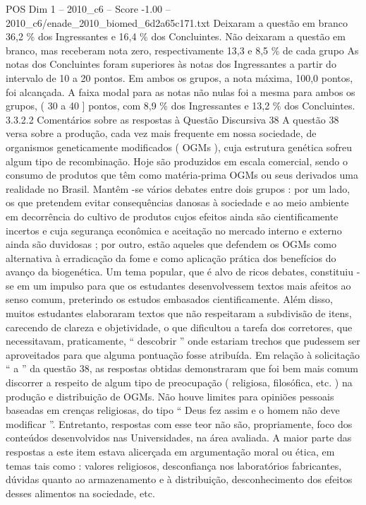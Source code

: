 \begin{textsample}{POS Dim 1 – 2010\_c6 – Score -1.00 – 2010\_c6/enade\_2010\_biomed\_6d2a65c171.txt}
Deixaram a questão em branco 36,2 \% dos Ingressantes e 16,4 \% dos Concluintes.
Não deixaram a questão em branco, mas receberam nota zero, respectivamente 13,3 e 8,5 \% de cada grupo As notas dos Concluintes foram superiores às notas dos Ingressantes a partir do intervalo de 10 a 20 pontos.
Em ambos os grupos, a nota máxima, 100,0 pontos, foi alcançada.
A faixa modal para as notas não nulas foi a mesma para ambos os grupos, ( 30 a 40 ] pontos, com 8,9 \% dos Ingressantes e 13,2 \% dos Concluintes. 3.3.2.2 Comentários sobre as respostas à Questão Discursiva 38 A questão 38 versa sobre a produção, cada vez mais frequente em nossa sociedade, de organismos geneticamente modificados ( OGMs ), cuja estrutura genética sofreu algum tipo de recombinação.
Hoje são produzidos em escala comercial, sendo o consumo de produtos que têm como matéria-prima OGMs ou seus derivados uma realidade no Brasil.
Mantêm -se vários debates entre dois grupos : por um lado, os que pretendem evitar consequências danosas à sociedade e ao meio ambiente em decorrência do cultivo de produtos cujos efeitos ainda são cientificamente incertos e cuja segurança econômica e aceitação no mercado interno e externo ainda são duvidosas ; por outro, estão aqueles que defendem os OGMs como alternativa à erradicação da fome e como aplicação prática dos benefícios do avanço da biogenética.
Um tema popular, que é alvo de ricos debates, constituiu -se em um impulso para que os estudantes desenvolvessem textos mais afeitos ao senso comum, preterindo os estudos embasados cientificamente.
Além disso, muitos estudantes elaboraram textos que não respeitaram a subdivisão de itens, carecendo de clareza e objetividade, o que dificultou a tarefa dos corretores, que necessitavam, praticamente, “ descobrir ” onde estariam trechos que pudessem ser aproveitados para que alguma pontuação fosse atribuída.
Em relação à solicitação “ a ” da questão 38, as respostas obtidas demonstraram que foi bem mais comum discorrer a respeito de algum tipo de preocupação ( religiosa, filosófica, etc. ) na produção e distribuição de OGMs.
Não houve limites para opiniões pessoais baseadas em crenças religiosas, do tipo “ Deus fez assim e o homem não deve modificar ”.
Entretanto, respostas com esse teor não são, propriamente, foco dos conteúdos desenvolvidos nas Universidades, na área avaliada.
A maior parte das respostas a este item estava alicerçada em argumentação moral ou ética, em temas tais como : valores religiosos, desconfiança nos laboratórios fabricantes, dúvidas quanto ao armazenamento e à distribuição, desconhecimento dos efeitos desses alimentos na sociedade, etc.

\end{textsample}
